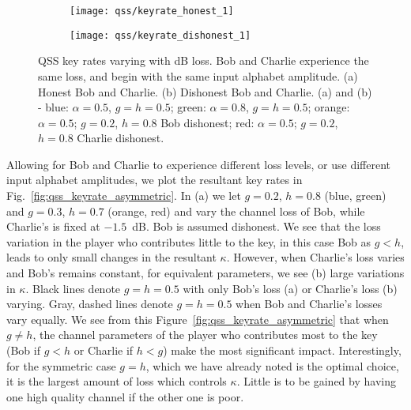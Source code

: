 \begin{figure}[htp]
\captionsetup{width=0.8\linewidth}
\centering
	\begin{subfigure}{0.49\linewidth}
	\centering
	\texttt{[image: qss/keyrate\_honest\_1]}
	\caption{}
	\end{subfigure}
	\begin{subfigure}{0.49\linewidth}
	\centering
	\texttt{[image: qss/keyrate\_dishonest\_1]}
	\caption{}
	\end{subfigure}
\caption{\label{fig:qss_keyrate} QSS key rates varying with dB loss. Bob and Charlie experience the same loss, and begin with the same input alphabet amplitude. (a) Honest Bob and Charlie. (b) Dishonest Bob and Charlie. (a) and (b) - blue: $\alpha=0.5$, $g=h=0.5$; green: $\alpha = 0.8$, $g = h = 0.5$; orange: $\alpha = 0.5$; $g = 0.2$, $h=0.8$ Bob dishonest; red: $\alpha = 0.5$; $g=0.2$, $h=0.8$ Charlie dishonest.}
\end{figure}


Allowing for Bob and Charlie to experience different loss levels, or use different input alphabet amplitudes, we plot the resultant key rates in Fig.~\ref{fig:qss_keyrate_asymmetric}. In (a) we let $g=0.2$, $h=0.8$ (blue, green) and $g=0.3$, $h=0.7$ (orange, red) and vary the channel loss of Bob, while Charlie's is fixed at $-1.5$~dB. Bob is assumed dishonest. We see that the loss variation in the player who contributes little to the key, in this case Bob as $g < h$, leads to only small changes in the resultant $\kappa$. However, when Charlie's loss varies and Bob's remains constant, for equivalent parameters, we see (b) large variations in $\kappa$. Black lines denote $g=h=0.5$ with only Bob's loss (a) or Charlie's loss (b) varying. Gray, dashed lines denote $g=h=0.5$ when Bob and Charlie's losses vary equally. We see from this Figure~\ref{fig:qss_keyrate_asymmetric} that when $g \ne h$, the channel parameters of the player who contributes most to the key (Bob if $g < h$ or Charlie if $h < g$) make the most significant impact. Interestingly, for the symmetric case $g=h$, which we have already noted is the optimal choice, it is the largest amount of loss which controls $\kappa$. Little is to be gained by having one high quality channel if the other one is poor. 


